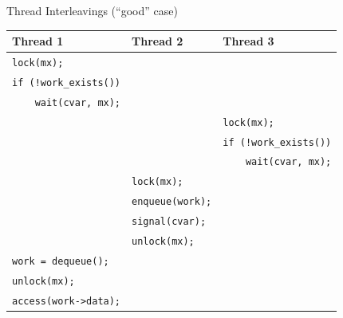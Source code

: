 \documentclass[xcolor=dvipsnames]{beamer}
\begin{document}
\begin{frame}{Thread Interleavings (``good'' case)}
	\begin{center}
		\begin{tabular}{|l|l|l|}
			\hline
			\cellcolor{thread1} {\bf Thread 1} & \cellcolor{thread2} {\bf Thread 2} & \cellcolor{thread3} {\bf Thread 3} \\
			\hline
			\small \texttt{lock(mx);} & & \\
			\small \texttt{if~(!work\_exists())} & & \\
			\small \texttt{~~~~wait(cvar,~mx);} & & \\

			& & \small \texttt{lock(mx);} \\
			& & \small \texttt{if~(!work\_exists())} \\
			& & \small \texttt{~~~~wait(cvar,~mx);} \\

			& \small \texttt{lock(mx);} & \\
			& \small \texttt{enqueue(work);} & \\
			& \small \texttt{signal(cvar);} & \\
			& \small \texttt{unlock(mx);} & \\

			\small \texttt{work~=~dequeue();~} & & \\
			\small \texttt{unlock(mx);} & & \\
			\small \texttt{access(work->data);}& & \\
			\hline
		\end{tabular}
	\end{center}
\end{frame}
\end{document}
